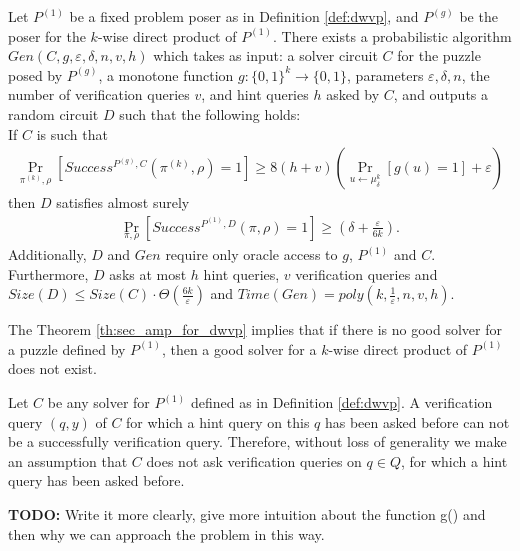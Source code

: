 \begin{theorem}
\label{th:sec_amp_for_dwvp}
Let $P^{(1)}$ be a fixed problem poser as in Definition \ref{def:dwvp}, and $P^{(g)}$ be the poser for the $k$-wise direct product of $P^{(1)}$.
There exists a probabilistic algorithm $Gen(C, g, \varepsilon, \delta, n, v, h)$ which takes as input: a solver circuit $C$ for the puzzle posed by $P^{(g)}$,
a monotone function $g:\{0,1\}^k \rightarrow \{0,1\}$, parameters $\varepsilon, \delta,n$,
the number of verification queries $v$, and hint queries $h$ asked by $C$, and outputs a random circuit $D$
such that the following holds: \\
If $C$ is such that \\
  \begin{align*}
    \underset{\pi^{(k)}, \rho}{\Pr}[Success^{P^{(g)}, C}(\pi^{(k)}, \rho) = 1] \geq 8(h+v)\left(\underset{u \leftarrow \mu_\delta^k}{\Pr}[g(u) = 1] + \varepsilon\right)
  \end{align*}
then $D$ satisfies almost surely
  \begin{align*}
    \underset{\pi, \rho}{\Pr}[Success^{P^{(1)},D}(\pi, \rho) = 1] \geq (\delta + \frac{\varepsilon}{6k}).
  \end{align*}
Additionally, $D$ and $Gen$ require only oracle access to $g$, $P^{(1)}$ and $C$. Furthermore, $D$ asks at most $h$ hint queries, $v$ verification queries and
$Size(D) \leq Size(C) \cdot \Theta(\frac{6k}{\varepsilon})$ and $Time(Gen) = poly(k, \frac{1}{\varepsilon}, n, v, h)$.
\end{theorem}
%
%
The Theorem \ref{th:sec_amp_for_dwvp} implies that if there is no good solver for a puzzle defined by $P^{(1)}$, then a good solver for
a $k$-wise direct product of $P^{(1)}$ does not exist.

Let $C$ be any solver for $P^{(1)}$ defined as in Definition \ref{def:dwvp}.
A verification query $(q,y)$ of $C$ for which a hint query on this $q$ has been asked before can not be a successfully verification query.
Therefore, without loss of generality we make an assumption that $C$ does not ask verification queries on $q \in Q$,
for which a hint query has been asked before.

\begin{todo}
  \textbf{TODO:} Write it more clearly, give more intuition about the function g() and then why we can approach the problem in this way.
\end{todo}

